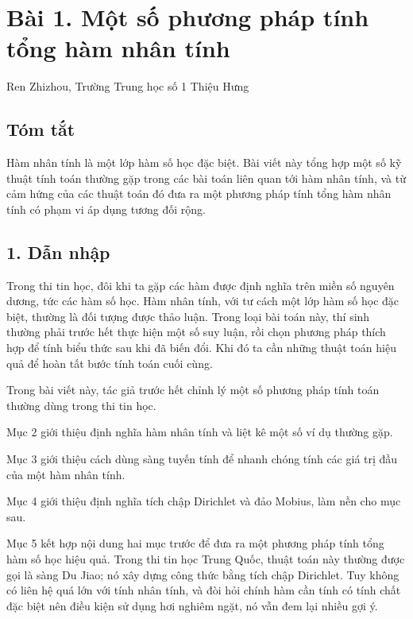 \documentclass[11pt]{article}
\begin{document}
\section*{Bài 1. Một số phương pháp tính tổng hàm nhân tính}

\begin{center}
Ren Zhizhou, Trường Trung học số 1 Thiệu Hưng
\end{center}

\subsection*{Tóm tắt}

Hàm nhân tính là một lớp hàm số học đặc biệt. Bài viết này tổng hợp một số kỹ
thuật tính toán thường gặp trong các bài toán liên quan tới hàm nhân tính, và
từ cảm hứng của các thuật toán đó đưa ra một phương pháp tính tổng hàm nhân
tính có phạm vi áp dụng tương đối rộng.

\subsection*{1. Dẫn nhập}

Trong thi tin học, đôi khi ta gặp các hàm được định nghĩa trên miền số nguyên
dương, tức các hàm số học. Hàm nhân tính, với tư cách một lớp hàm số học đặc
biệt, thường là đối tượng được thảo luận. Trong loại bài toán này, thí sinh
thường phải trước hết thực hiện một số suy luận, rồi chọn phương pháp thích
hợp để tính biểu thức sau khi đã biến đổi. Khi đó ta cần những thuật toán hiệu
quả để hoàn tất bước tính toán cuối cùng.

Trong bài viết này, tác giả trước hết chỉnh lý một số phương pháp tính toán
thường dùng trong thi tin học.

Mục 2 giới thiệu định nghĩa hàm nhân tính và liệt kê một số ví dụ thường gặp.

Mục 3 giới thiệu cách dùng sàng tuyến tính để nhanh chóng tính các giá trị
đầu của một hàm nhân tính.

Mục 4 giới thiệu định nghĩa tích chập Dirichlet và đảo Mobius, làm nền cho
mục sau.

Mục 5 kết hợp nội dung hai mục trước để đưa ra một phương pháp tính tổng hàm
số học hiệu quả. Trong thi tin học Trung Quốc, thuật toán này thường được gọi
là sàng Du Jiao; nó xây dựng công thức bằng tích chập Dirichlet. Tuy không có
liên hệ quá lớn với tính nhân tính, và đòi hỏi chính hàm cần tính có tính chất
đặc biệt nên điều kiện sử dụng hơi nghiêm ngặt, nó vẫn đem lại nhiều gợi ý.
\end{document}
